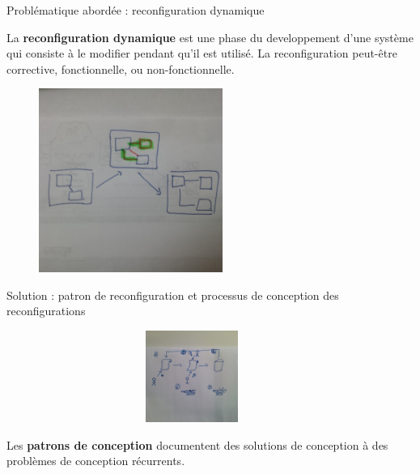 \begin{frame}{Problématique abordée : reconfiguration dynamique}
\begin{definition}
La \textbf{reconfiguration dynamique} est une phase du
developpement d'une système qui consiste à le modifier pendant qu’il est
utilisé. La reconfiguration peut-être corrective, fonctionnelle,  ou
non-fonctionnelle.
\end{definition}
\begin{figure}
\includegraphics[height=6cm]{imgs/description_reconfiguration}
\end{figure}
\end{frame}
%
\begin{frame}{Solution : patron de reconfiguration et processus de
conception des reconfigurations}
\begin{figure}
\includegraphics[width=10cm, height=3cm]{imgs/slide_application_patron}
\end{figure}
\begin{definition}
Les \textbf{patrons de conception} documentent des solutions de
conception à des problèmes de conception récurrents.
\end{definition}
\end{frame}

